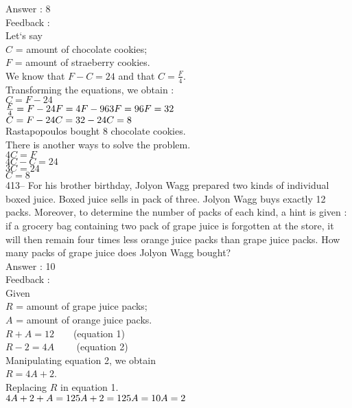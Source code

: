 \documentclass[letterpaper, 12pt]{article}
\begin{document}
Answer : 8\\

Feedback : \\
Let`s say\\
$C$ = amount of chocolate cookies;\\
$F$ = amount of straeberry cookies.\\
We know that $F-C=24$ and that $C=\frac{F}{4}$.\\
Transforming the equations, we obtain :\\
$C=F-24$\\
$\frac{F}{4}=F-24\\
F=4F-96\\
3F=96\\
F=32$\\

$C=F-24\\
C=32-24\\
C=8$\\
Rastapopoulos bought 8 chocolate cookies.\\

There is another ways to solve the problem.\\
$4C=F$\\
$4C-C=24$\\
$3C=24$\\
$C=8$\\


413-- For his brother birthday, Jolyon Wagg prepared two kinds of individual boxed juice. Boxed juice sells in pack of three.  Jolyon Wagg buys exactly 12 packs. Moreover, to determine the number of packs of each kind, a hint is given : if a grocery bag containing two pack of grape juice is forgotten at the store, it will then remain four times less orange juice packs than grape juice packs. How many packs of grape juice does Jolyon Wagg bought?\\

Answer : 10\\

Feedback : \\
Given\\
$R$ = amount of grape juice packs;\\
$A$ = amount of orange juice packs.\\
$R+A=12  \qquad$(equation 1)\\
$R-2=4A \qquad$ (equation 2)\\
Manipulating equation 2, we obtain\\
$R=4A+2$.\\
Replacing $R$ in equation 1.\\
$4A+2+A=12\\
5A+2=12\\
5A=10\\
A=2$\\
\end{document}
